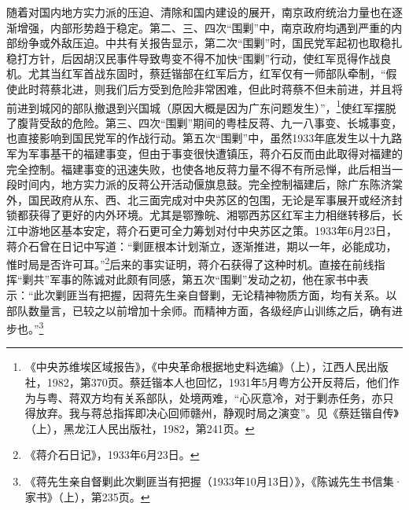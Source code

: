 随着对国内地方实力派的压迫、清除和国内建设的展开，南京政府统治力量也在逐渐增强，内部形势趋于稳定。第二、三、四次“围剿”中，南京政府均遇到严重的内部纷争或外敌压迫。中共有关报告显示，第二次“围剿”时，国民党军起初也取稳扎稳打方针，后因胡汉民事件导致粤变不得不加快“围剿”行动，使红军觅得作战良机。尤其当红军首战东固时，蔡廷锴部在红军后方，红军仅有一师部队牵制，“假使此时蒋蔡北进，则我们后方受到危险非常困难，但此时蒋蔡不但未前进，并且将前进到城冈的部队撤退到兴国城（原因大概是因为广东问题发生）”，\footnote{《中央苏维埃区域报告》，《中央革命根据地史料选编》（上），江西人民出版社，1982，第370页。蔡廷锴本人也回忆，1931年5月粤方公开反蒋后，他们作为与粤、蒋双方均有关系部队，处境两难，“心灰意冷，对于剿赤任务，亦只得放弃。我与蒋总指挥即决心回师赣州，静观时局之演变”。见《蔡廷锴自传》（上），黑龙江人民出版社，1982，第241页。}使红军摆脱了腹背受敌的危险。第三、四次“围剿”期间的粤桂反蒋、九一八事变、长城事变，也直接影响到国民党军的作战行动。第五次“围剿”中，虽然1933年底发生以十九路军为军事基干的福建事变，但由于事变很快遭镇压，蒋介石反而由此取得对福建的完全控制。福建事变的迅速失败，也使各地反蒋力量不得不有所忌惮，此后相当一段时间内，地方实力派的反蒋公开活动偃旗息鼓。完全控制福建后，除广东陈济棠外，国民政府从东、西、北三面完成对中央苏区的包围，无论是军事展开或经济封锁都获得了更好的内外环境。尤其是鄂豫皖、湘鄂西苏区红军主力相继转移后，长江中游地区基本安定，蒋介石更可全力筹划对付中央苏区之策。1933年6月23日，蒋介石曾在日记中写道：“剿匪根本计划渐立，逐渐推进，期以一年，必能成功，惟时局是否许可耳。”\footnote{《蒋介石日记》，1933年6月23日。}后来的事实证明，蒋介石获得了这种时机。直接在前线指挥“剿共”军事的陈诚对此颇有同感，第五次“围剿”发动之初，他在家书中表示：“此次剿匪当有把握，因蒋先生亲自督剿，无论精神物质方面，均有关系。以部队数量言，已较之以前增加十余师。而精神方面，各级经庐山训练之后，确有进步也。”\footnote{《蒋先生亲自督剿此次剿匪当有把握（1933年10月13日）》，《陈诚先生书信集·家书》（上），第235页。}


